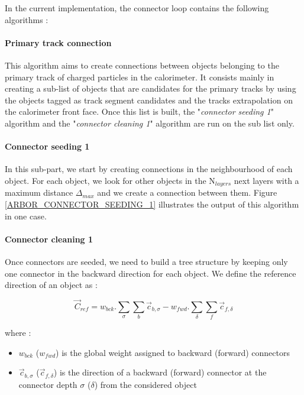 \documentclass[cits]{JINST}
\begin{document}
In the current implementation, the connector loop contains the following algorithms :

\paragraph*{Primary track connection} This algorithm aims to create connections between objects belonging to the primary track of charged particles in the calorimeter. It consists mainly in creating a sub-list of objects that are candidates for the primary tracks by using the objects tagged as track segment candidates and the tracks extrapolation on the calorimeter front face. Once this list is built, the "\textit{connector seeding 1}" algorithm and the "\textit{connector cleaning 1}" algorithm are run on the sub list only. 

\paragraph*{Connector seeding 1} In this sub-part, we start by creating connections in the neighbourhood of each object. For each object, we look for other objects in the N$_{layers}$ next layers with a maximum distance $\Delta_{max}$ and we create a connection between them. Figure \ref{ARBOR_CONNECTOR_SEEDING_1} illustrates the output of this algorithm in one case.

\paragraph*{Connector cleaning 1} Once connectors are seeded, we need to build a tree structure by keeping only one connector in the backward direction for each object. We define the reference direction of an object as :

\begin{equation}
  \vec{C}_{ref} = w_{bck} . \sum_\sigma \sum_b \vec{c}_{b,\sigma} - w_{fwd} . \sum_\delta \sum_f \vec{c}_{f,\delta}
\end{equation}

where :

\begin{itemize}
  \item $w_{bck}$ ($w_{fwd}$) is the global weight assigned to backward (forward) connectors
  \item $\vec{c}_{b,\sigma}$ ($\vec{c}_{f,\delta}$) is the direction of a backward (forward) connector at the connector depth $\sigma$ ($\delta$) from the considered object
\end{itemize}
\end{document}
